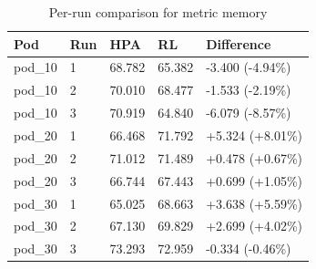 \begin{table}[ht]
  \centering
  \caption{Per-run comparison for metric memory}\label{tab:deskriptif-memory-per-run}
  \begin{tabular}{lllll}
    \toprule
    Pod & Run & HPA & RL & Difference \\
    \midrule
    pod\_10 & 1 & 68.782 & 65.382 & -3.400 (-4.94\%) \\
    pod\_10 & 2 & 70.010 & 68.477 & -1.533 (-2.19\%) \\
    pod\_10 & 3 & 70.919 & 64.840 & -6.079 (-8.57\%) \\
    pod\_20 & 1 & 66.468 & 71.792 & +5.324 (+8.01\%) \\
    pod\_20 & 2 & 71.012 & 71.489 & +0.478 (+0.67\%) \\
    pod\_20 & 3 & 66.744 & 67.443 & +0.699 (+1.05\%) \\
    pod\_30 & 1 & 65.025 & 68.663 & +3.638 (+5.59\%) \\
    pod\_30 & 2 & 67.130 & 69.829 & +2.699 (+4.02\%) \\
    pod\_30 & 3 & 73.293 & 72.959 & -0.334 (-0.46\%) \\
    \bottomrule
  \end{tabular}
\end{table}